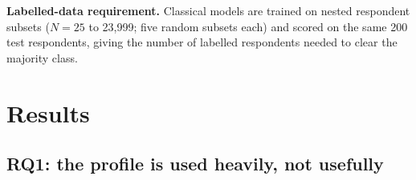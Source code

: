 \documentclass[conference]{IEEEtran}
\begin{document}
\textbf{Labelled-data requirement.} Classical models are trained on nested respondent subsets ($N=25$ to 23{,}999; five random subsets each) and scored on the same 200 test respondents, giving the number of labelled respondents needed to clear the majority class.

\section{Results}

\subsection{RQ1: the profile is used heavily, not usefully}

\begin{table}[!t]
\caption{Pew, 200 held-out respondents (1{,}548 rows; the direction and variance columns exclude one non-ordinal item, 1{,}351 rows and 182 cells). Dir.\ $r$: correlation between predicted and true group differences. Profile var.: share of variance explained by the profile beyond item effects.}
\label{tab:controls}
\centering
\scriptsize

\end{table}
\end{document}
